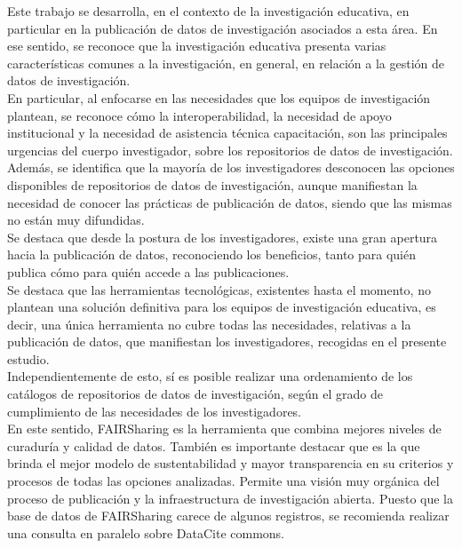 \documentclass{article}
\begin{document}
Este trabajo se desarrolla, en el contexto de la investigación educativa, en particular en la publicación de datos de investigación asociados a esta área. En ese sentido, se reconoce que la investigación educativa presenta varias características comunes a la investigación, en general, en relación a la gestión de datos de investigación.\\

En particular, al enfocarse en las necesidades que los equipos de investigación plantean, se reconoce cómo la interoperabilidad, la necesidad de apoyo institucional y la necesidad de asistencia técnica capacitación, son las principales urgencias del cuerpo investigador, sobre los repositorios de datos de investigación.\\

Además, se identifica que la mayoría de los investigadores desconocen las opciones disponibles de repositorios de datos de investigación, aunque manifiestan la necesidad de conocer las prácticas de publicación de datos, siendo que las mismas no están muy difundidas.\\

Se destaca que desde la postura de los investigadores, existe una gran apertura hacia la publicación de datos, reconociendo los beneficios, tanto para quién publica cómo para quién accede a las publicaciones.\\

Se destaca que las herramientas tecnológicas, existentes hasta el momento, no plantean una solución definitiva para los equipos de investigación educativa, es decir, una única herramienta no cubre todas las necesidades, relativas a la publicación de datos, que manifiestan los investigadores, recogidas en el presente estudio.\\

Independientemente de esto, sí es posible realizar una ordenamiento de los catálogos de repositorios de datos de investigación, según el grado de cumplimiento de las necesidades de los investigadores.\\

En este sentido, FAIRSharing es la herramienta que combina mejores niveles de curaduría y calidad de datos. También es importante destacar que es la que brinda el mejor modelo de sustentabilidad y mayor transparencia en su criterios y procesos de todas las opciones analizadas.
Permite una visión muy orgánica del proceso de publicación y la infraestructura de investigación abierta.
Puesto que la base de datos de FAIRSharing carece de algunos registros, se recomienda realizar una consulta en paralelo sobre DataCite commons.\\
\end{document}
